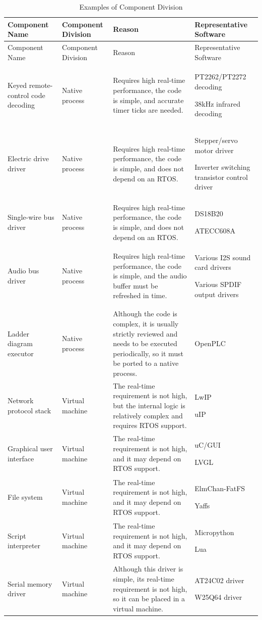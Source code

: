 \begin{xltabular}{\textwidth}{@{}>{\hsize\raggedright\arraybackslash}X>{\hsize\raggedright\arraybackslash}X>{\hsize\raggedright\arraybackslash}X>{\hsize\raggedright\arraybackslash}X@{}}
\caption{Examples of Component Division}\label{tab:6-1}\\
\toprule
Component Name & Component Division & Reason & Representative Software\tabularnewline
\endfirsthead
\toprule
Component Name & Component Division & Reason & Representative Software\tabularnewline
\midrule
\endhead
\bottomrule
\endlastfoot
Keyed remote-control code decoding\strut
 & Native process\strut
 & Requires high real-time performance, the code is simple, and accurate timer ticks are needed.\strut
 & PT2262/PT2272 decoding

38kHz infrared decoding\strut
\tabularnewline
Electric drive driver\strut
 & Native process\strut
 & Requires high real-time performance, the code is simple, and does not depend on an RTOS.\strut
 & Stepper/servo motor driver

Inverter switching transistor control driver\strut
\tabularnewline
Single-wire bus driver\strut
 & Native process\strut
 & Requires high real-time performance, the code is simple, and does not depend on an RTOS.\strut
 & DS18B20

ATECC608A\strut
\tabularnewline
Audio bus driver\strut
 & Native process\strut
 & Requires high real-time performance, the code is simple, and the audio buffer must be refreshed in time.\strut
 & Various I2S sound card drivers

Various SPDIF output drivers\strut
\tabularnewline
Ladder diagram executor & Native process &
Although the code is complex, it is usually strictly reviewed and needs to be executed periodically, so it must be ported to a native process.
& OpenPLC\tabularnewline
Network protocol stack\strut
 & Virtual machine\strut
 & The real-time requirement is not high, but the internal logic is relatively complex and requires RTOS support.\strut
 & LwIP

uIP\strut
\tabularnewline
Graphical user interface\strut
 & Virtual machine\strut
 & The real-time requirement is not high, and it may depend on RTOS support.\strut
 & uC/GUI

LVGL\strut
\tabularnewline
File system\strut
 & Virtual machine\strut
 & The real-time requirement is not high, and it may depend on RTOS support.\strut
 & ElmChan-FatFS

Yaffs\strut
\tabularnewline
Script interpreter\strut
 & Virtual machine\strut
 & The real-time requirement is not high, and it may depend on RTOS support.\strut
 & Micropython

Lua\strut
\tabularnewline
Serial memory driver\strut
 & Virtual machine\strut
 & Although this driver is simple, its real-time requirement is not high, so it can be placed in a virtual machine.\strut
 & AT24C02 driver

W25Q64 driver\strut
\tabularnewline
\end{xltabular}

